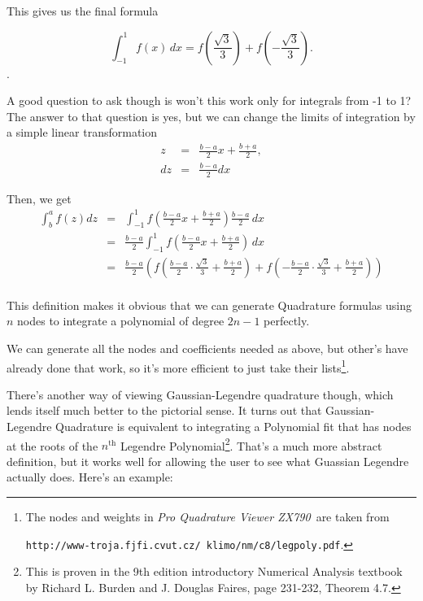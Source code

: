 \documentclass[12pt]{article}
\newcommand{\newLine}{\vspace{5mm}}
\newcommand{\appname}{\textit{Pro Quadrature Viewer ZX790}}
\newcommand{\integral}[3]{\text{$\int^{#2}_{#1} #3\,dx$}}
\begin{document}
This gives us the final formula

\begin{equation*} \integral{-1}{1}{f(x)} = f(\frac{\sqrt{3}}{3}) + f(-\frac{\sqrt{3}}{3}). \end{equation*}.

A good question to ask though is won't this work only for integrals from -1 to 1? The answer to that question is yes, but we can change the limits of integration by a simple linear transformation 
\begin{eqnarray*} z &=& \frac{b-a}{2}x + \frac{b+a}{2}, \\
dz &=& \frac{b-a}{2}dx
\end{eqnarray*}

\noindent Then, we get
\begin{eqnarray*}
\int^a_b f(z)dz &=& \integral{-1}{1}{f(\frac{b-a}{2}x + \frac{b+a}{2})\frac{b-a}{2}} \\
&=& \frac{b-a}{2}\integral{-1}{1}{f(\frac{b-a}{2}x + \frac{b+a}{2})} \\
&=& \frac{b-a}{2}\left(f(\frac{b-a}{2}\cdot\frac{\sqrt{3}}{3}+ \frac{b+a}{2}) + f(-\frac{b-a}{2}\cdot\frac{\sqrt{3}}{3}+ \frac{b+a}{2}) \right)\\
\end{eqnarray*}

This definition makes it obvious that we can generate Quadrature formulas using $n$ nodes to integrate a polynomial of degree $2n-1$ perfectly. 

We can generate all the nodes and coefficients needed as above, but other's have already done that work, so it's more efficient to just take their lists\footnote{The nodes and weights in \appname\, are taken from

\texttt{http://www-troja.fjfi.cvut.cz/~klimo/nm/c8/legpoly.pdf}.}.

\newLine There's another way of viewing Gaussian-Legendre quadrature though, which lends itself much better to the pictorial sense. It turns out that Gaussian-Legendre Quadrature is equivalent to integrating a Polynomial fit that has nodes at the roots of the $n^{\text{th}}$ Legendre Polynomial\footnote{This is proven in the 9th edition introductory Numerical Analysis textbook by Richard L. Burden and J. Douglas Faires, page 231-232, Theorem 4.7.}. That's a much more abstract definition, but it works well for allowing the user to see what Guassian Legendre actually does. Here's an example:
\end{document}
